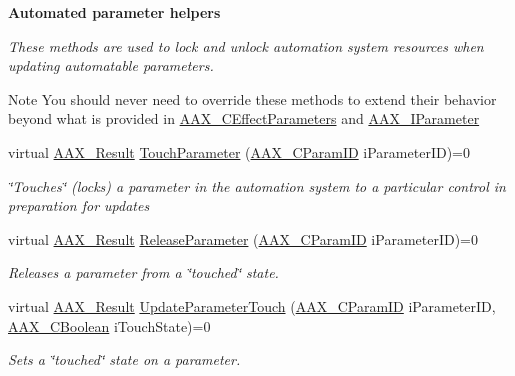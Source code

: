 \begin{Indent}\textbf{ Automated parameter helpers}\par
{\em These methods are used to lock and unlock automation system \textquotesingle{}resources\textquotesingle{} when updating automatable parameters.

\begin{DoxyNote}{Note}
You should never need to override these methods to extend their behavior beyond what is provided in \mbox{\hyperlink{a01481}{A\+A\+X\+\_\+\+C\+Effect\+Parameters}} and \mbox{\hyperlink{a01857}{A\+A\+X\+\_\+\+I\+Parameter}} 
\end{DoxyNote}
}\begin{DoxyCompactItemize}
\item 
virtual \mbox{\hyperlink{a00392_a4d8f69a697df7f70c3a8e9b8ee130d2f}{A\+A\+X\+\_\+\+Result}} \mbox{\hyperlink{a01669_ae82e80cbfd9cb837f8101a85f06856ba}{Touch\+Parameter}} (\mbox{\hyperlink{a00392_a1440c756fe5cb158b78193b2fc1780d1}{A\+A\+X\+\_\+\+C\+Param\+ID}} i\+Parameter\+ID)=0
\begin{DoxyCompactList}\small\item\em \char`\"{}\+Touches\char`\"{} (locks) a parameter in the automation system to a particular control in preparation for updates \end{DoxyCompactList}\item 
virtual \mbox{\hyperlink{a00392_a4d8f69a697df7f70c3a8e9b8ee130d2f}{A\+A\+X\+\_\+\+Result}} \mbox{\hyperlink{a01669_a2caf1b7b8e2dad62cf96f144479dee60}{Release\+Parameter}} (\mbox{\hyperlink{a00392_a1440c756fe5cb158b78193b2fc1780d1}{A\+A\+X\+\_\+\+C\+Param\+ID}} i\+Parameter\+ID)=0
\begin{DoxyCompactList}\small\item\em Releases a parameter from a \char`\"{}touched\char`\"{} state. \end{DoxyCompactList}\item 
virtual \mbox{\hyperlink{a00392_a4d8f69a697df7f70c3a8e9b8ee130d2f}{A\+A\+X\+\_\+\+Result}} \mbox{\hyperlink{a01669_a93483f44315bdf3adf60bf5bf773fbb8}{Update\+Parameter\+Touch}} (\mbox{\hyperlink{a00392_a1440c756fe5cb158b78193b2fc1780d1}{A\+A\+X\+\_\+\+C\+Param\+ID}} i\+Parameter\+ID, \mbox{\hyperlink{a00392_aa216506530f1d19a2965931ced2b274b}{A\+A\+X\+\_\+\+C\+Boolean}} i\+Touch\+State)=0
\begin{DoxyCompactList}\small\item\em Sets a \char`\"{}touched\char`\"{} state on a parameter. \end{DoxyCompactList}\end{DoxyCompactItemize}
\end{Indent}
